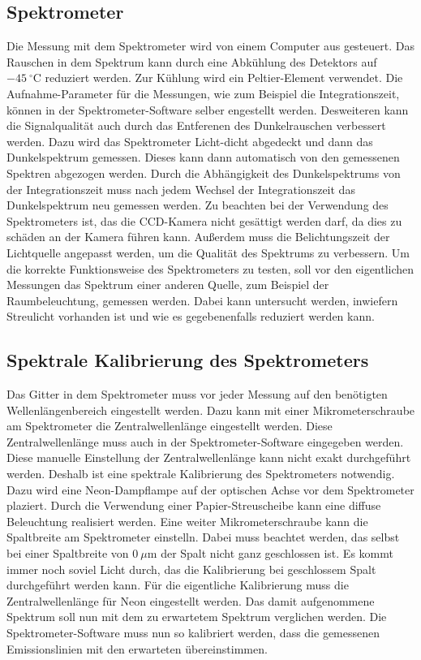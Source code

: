 \subsection{Spektrometer}
Die Messung mit dem Spektrometer wird von einem Computer aus gesteuert. Das Rauschen in dem Spektrum kann durch eine Abkühlung des Detektors auf $-45\ {}^\circ\mathrm{C}$ reduziert werden. Zur Kühlung wird ein Peltier-Element verwendet. 
Die Aufnahme-Parameter für die Messungen, wie zum Beispiel die Integrationszeit, können in der Spektrometer-Software selber engestellt werden. 
Desweiteren kann die Signalqualität auch durch das Entferenen des Dunkelrauschen verbessert werden. 
Dazu wird das Spektrometer Licht-dicht abgedeckt und dann das Dunkelspektrum gemessen. 
Dieses kann dann automatisch von den gemessenen Spektren abgezogen werden. 
Durch die Abhängigkeit des Dunkelspektrums von der Integrationszeit muss nach jedem Wechsel der Integrationszeit das Dunkelspektrum neu gemessen werden. 
Zu beachten bei der Verwendung des Spektrometers ist, das die CCD-Kamera nicht gesättigt werden darf, da dies zu schäden an der Kamera führen kann. 
Außerdem muss die Belichtungszeit der Lichtquelle angepasst werden, um die Qualität des Spektrums zu verbessern. 
Um die korrekte Funktionsweise des Spektrometers zu testen, soll vor den eigentlichen Messungen das Spektrum einer anderen Quelle, zum Beispiel der Raumbeleuchtung, gemessen werden. 
Dabei kann untersucht werden, inwiefern Streulicht vorhanden ist und wie es gegebenenfalls reduziert werden kann. 
\subsection{Spektrale Kalibrierung des Spektrometers}
\label{sec:Kalibrierung}
Das Gitter in dem Spektrometer muss vor jeder Messung auf den benötigten Wellenlängenbereich eingestellt werden. 
Dazu kann mit einer Mikrometerschraube am Spektrometer die Zentralwellenlänge eingestellt werden. 
Diese Zentralwellenlänge muss auch in der Spektrometer-Software eingegeben werden. 
Diese manuelle Einstellung der Zentralwellenlänge kann nicht exakt durchgeführt werden. 
Deshalb ist eine spektrale Kalibrierung des Spektrometers notwendig.
Dazu wird eine Neon-Dampflampe auf der optischen Achse vor dem Spektrometer plaziert. Durch die Verwendung einer Papier-Streuscheibe kann eine diffuse Beleuchtung realisiert werden.
Eine weiter Mikrometerschraube kann die Spaltbreite am Spektrometer einstelln. Dabei muss beachtet werden, das selbst bei einer  Spaltbreite von $0\ \mu$m der Spalt nicht ganz geschlossen ist. 
Es kommt immer noch soviel Licht durch, das die Kalibrierung bei geschlossem Spalt durchgeführt werden kann.
Für die eigentliche Kalibrierung muss die Zentralwellenlänge für Neon eingestellt werden. 
Das damit aufgenommene Spektrum soll nun mit dem zu erwartetem Spektrum verglichen werden. 
Die Spektrometer-Software muss nun so kalibriert werden, dass die gemessenen Emissionslinien mit den erwarteten übereinstimmen. 
